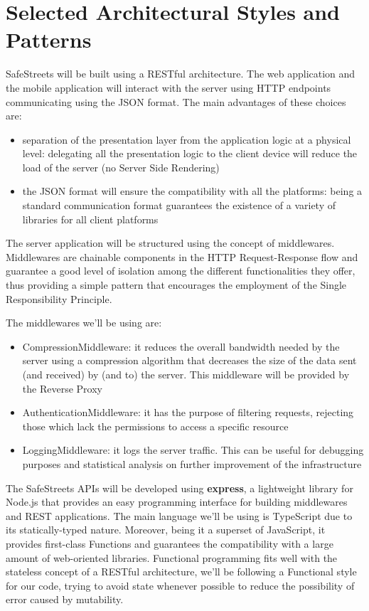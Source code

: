 \section{Selected Architectural Styles and Patterns}

SafeStreets will be built using a RESTful architecture. The web application and the mobile application will interact with the server using
HTTP endpoints communicating using the JSON format.
The main advantages of these choices are:
\begin{itemize}
  \item separation of the presentation layer from the application logic at a physical level: delegating
  all the presentation logic to the client device will reduce the load of the server (no Server Side Rendering)
  \item the JSON format will ensure the compatibility with all the platforms: being a standard communication format
  guarantees the existence of a variety of libraries for all client platforms
\end{itemize}

The server application will be structured using the concept of middlewares.
Middlewares are chainable components in the HTTP Request-Response flow and guarantee a good
level of isolation among the different functionalities they offer, thus providing a simple pattern that
encourages the employment of the Single Responsibility Principle.

The middlewares we'll be using are:
\begin{itemize}
  \item CompressionMiddleware: it reduces the overall bandwidth needed by the server using a compression algorithm that decreases the size of the data sent (and received) by (and to) the server.
  This middleware will be provided by the Reverse Proxy
  \item AuthenticationMiddleware: it has the purpose of filtering requests, rejecting those which lack the permissions to access a specific resource
  \item LoggingMiddleware: it logs the server traffic. This can be useful for debugging purposes and statistical analysis on further improvement of the infrastructure
\end{itemize}

The SafeStreets APIs will be developed using \textbf{express}, a lightweight library for Node.js that provides an easy
programming interface for building middlewares and REST applications.
The main language we'll be using is TypeScript due to its statically-typed nature. Moreover, being it a superset of JavaScript,
it provides first-class Functions and guarantees the compatibility with a large amount of web-oriented libraries.
Functional programming fits well with the stateless concept of a RESTful architecture, we'll be following a Functional style for our code,
trying to avoid state whenever possible to reduce the possibility of error caused by mutability.

